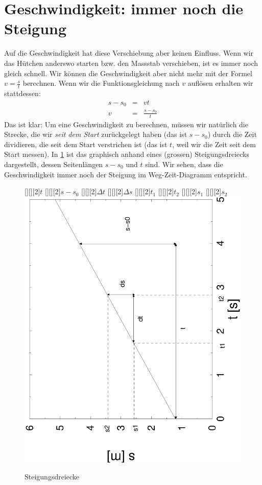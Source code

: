 \documentclass[%
11pt,%
twoside,%
titlepage,%
german,%
headsepline%
]{scrartcl}
\begin{document}
{\section{Geschwindigkeit: immer noch die Steigung}
\label{linfkt2:vsteigung}

Auf die Geschwindigkeit hat diese Verschiebung aber keinen Einfluss. Wenn wir das H\"utchen anderswo starten bzw. den Massstab verschieben, ist es immer noch gleich schnell. Wir k\"onnen die Geschwindigkeit aber nicht mehr mit der Formel $v=\frac{s}{t}$ berechnen. Wenn wir die Funktionsgleichung nach $v$ aufl\"osen erhalten wir stattdessen:
\begin{eqnarray*}
  s - s_0 & = & vt \\
  v & = & \frac{s-s_0}{t}
\end{eqnarray*}
Das ist klar: Um eine Geschwindigkeit zu berechnen, m\"ussen wir nat\"urlich die Strecke, die wir \emph{seit dem Start} zur\"uckgelegt haben (das ist $s-s_0$) durch die Zeit dividieren, die seit dem Start verstrichen ist (das ist $t$, weil wir die Zeit seit dem Start messen). In \ref{fig:linfkt2:stdreieck} ist das graphisch anhand eines (grossen) Steigungsdreiecks dargestellt, dessen Seitenl\"angen $s-s_0$ und $t$ sind. Wir sehen, dass die Geschwindigkeit immer noch der Steigung im Weg-Zeit-Diagramm entspricht. 

\begin{figure}[b!]
  \centering
  [][][2]{$t$} [][][2]{$s-s_0$} [][][2]{$\Delta t$} [][][2]{$\Delta s$}
  [][][2]{$t_1$} [][][2]{$t_2$} [][][2]{$s_1$} [][][2]{$s_2$} 
  \includegraphics[angle=-90,width=\columnwidth]{pictures/stdreieck.eps}
  \caption{Steigungsdreiecke}
  \label{fig:linfkt2:stdreieck}
\end{figure}

}
\end{document}
